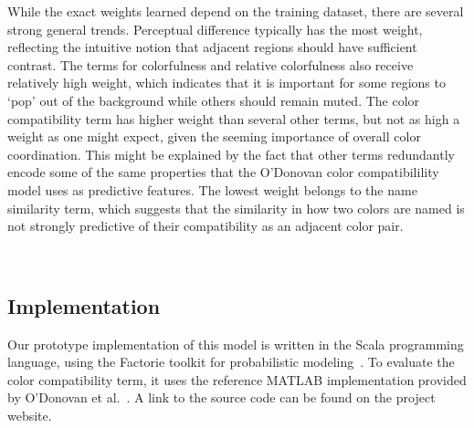 While the exact weights learned depend on the training dataset, there are several strong general trends.
Perceptual difference typically has the most weight, reflecting the intuitive notion that adjacent regions should have sufficient contrast. The terms for colorfulness and relative colorfulness also receive relatively high weight, which indicates that it is important for some regions to `pop' out of the background while others should remain muted. The color compatibility term has higher weight than several other terms, but not as high a weight as one might expect, given the seeming importance of overall color coordination. This might be explained by the fact that other terms redundantly encode some of the same properties that the O'Donovan color compatibilility model uses as predictive features. The lowest weight belongs to the name similarity term, which suggests that the similarity in how two colors are named is not strongly predictive of their compatibility as an adjacent color pair.

~

\subsection{Implementation}
\label{sec:implementation}

Our prototype implementation of this model is written in the Scala programming language, using the Factorie toolkit for probabilistic modeling~\cite{Factorie}. To evaluate the color compatibility term, it uses the reference MATLAB implementation provided by O'Donovan et al.~. A link to the source code can be found on the project website.